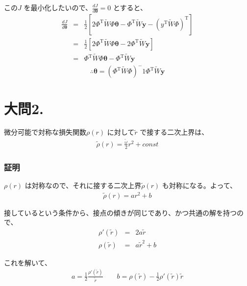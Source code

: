 \documentclass[fleqn]{jsarticle}
\begin{document}
この$J$ を最小化したいので、$\frac{dJ}{d\mathbf \theta} = 0$ とすると、
\begin{eqnarray*}
  \frac{dJ}{d\mathbf \theta} &=& \frac{1}{2} \left[ 2 \Phi^{\mathrm T} \tilde W \Phi \mathbf \theta
    - \Phi^{\mathrm T} \tilde {W} \mathbf y - (y^{\mathrm T} \tilde W \Phi)^{\mathrm T} \right]\\
  &=& \frac{1}{2} \left[ 2 \Phi^{\mathrm T} \tilde W \Phi \mathbf \theta - 2 \Phi^{\mathrm T} \tilde {W} \mathbf y \right]\\
  &=& \Phi^{\mathrm T} \tilde W \Phi \mathbf \theta - \Phi^{\mathrm T} \tilde {W} \mathbf y
\end{eqnarray*}
\begin{eqnarray*}
  \therefore \hat{\mathbf \theta} = (\Phi^{\mathrm T} \tilde{W} \Phi)^-1 \Phi^{\mathrm T} \tilde{W} \mathbf{y}
\end{eqnarray*}





\section*{大問2.}
微分可能で対称な損失関数$\rho(r)$ に対して$\tilde{r}$ で接する二次上界は、
\begin{eqnarray*}
  \tilde{\rho}(r) = \frac{\tilde{\omega}}{2} r^2 + const
\end{eqnarray*}

\subsubsection*{証明}
$\rho(r)$ は対称なので、それに接する二次上界$\tilde{\rho}(r)$ も対称になる。よって、
\begin{eqnarray*}
  \tilde{\rho}(r) = a r^2 + b
\end{eqnarray*}


接しているという条件から、接点の傾きが同じであり、かつ共通の解を持つので、
\begin{eqnarray*}
  \rho'(\tilde r) &=& 2 a \tilde{r}\\
  \rho(\tilde r) &=& a \tilde{r}^2 + b
\end{eqnarray*}

これを解いて、
\begin{eqnarray*}
  a = \frac{1}{2} \frac{\rho'(\tilde r)}{\tilde r} \hspace{2em} b = \rho(\tilde r) - \frac{1}{2} \rho'(\tilde r) \tilde r
\end{eqnarray*}
\end{document}
